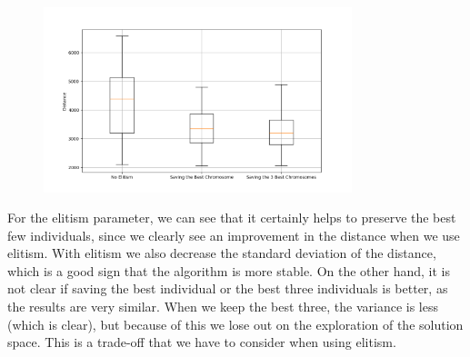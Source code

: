 \documentclass[11pt]{article}
\begin{document}
\begin{figure}
    \includegraphics[width=0.8\textwidth]{../results/elitism_boxplot.png}
    \label{fig:elitism}
\end{figure}

For the elitism parameter, we can see that it certainly helps to preserve the best few individuals, since we clearly see an improvement in the distance when we use elitism. With elitism we also decrease the standard deviation of the distance, which is a good sign that the algorithm is more stable. On the other hand, it is not clear if saving the best individual or the best three individuals is better, as the results are very similar. When we keep the best three, the variance is less (which is clear), but because of this we lose out on the exploration of the solution space. This is a trade-off that we have to consider when using elitism.
\end{document}
